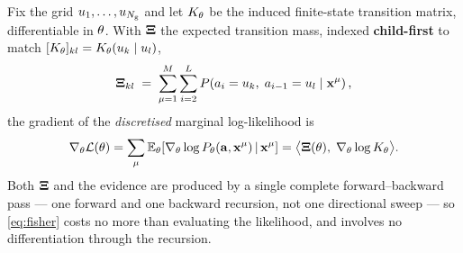 
\begin{proposition}
\label{prop:fisher}
Fix the grid $u_{1},\dots,u_{N_{\mathrm{g}}}$ and let $K_{\theta}$ be the induced finite-state
transition matrix, differentiable in $\theta$. With $\mathbf{\Xi}$ the expected transition mass,
indexed \textbf{child-first} to match
$[K_{\theta}]_{kl} = K_\theta(u_{k}\mid u_{l})$,
\begin{equation}
\label{eq:xi}
\mathbf{\Xi}_{kl} \;=\; \sum_{\mu=1}^{M}\sum_{i=2}^{L}
P\!\left(a_i=u_{k},\; a_{i-1}=u_{l} \;\middle|\; \mathbf{x}^\mu\right),
\end{equation}
the gradient of the \emph{discretised} marginal log-likelihood is
\begin{equation}
\label{eq:fisher}
\nabla_\theta \mathcal{L}(\theta)
= \sum_{\mu}\mathbb{E}_\theta\!\left[\nabla_\theta \log P_\theta(\mathbf{a},\mathbf{x}^\mu)\,\middle|\,\mathbf{x}^\mu\right]
= \big\langle \mathbf{\Xi}(\theta),\; \nabla_\theta \log K_{\theta} \big\rangle .
\end{equation}
Both $\mathbf{\Xi}$ and the evidence are produced by a single complete forward--backward pass --- one
forward and one backward recursion, not one directional sweep --- so \eqref{eq:fisher} costs no
more than evaluating the likelihood, and involves no differentiation through the recursion.
\end{proposition}

